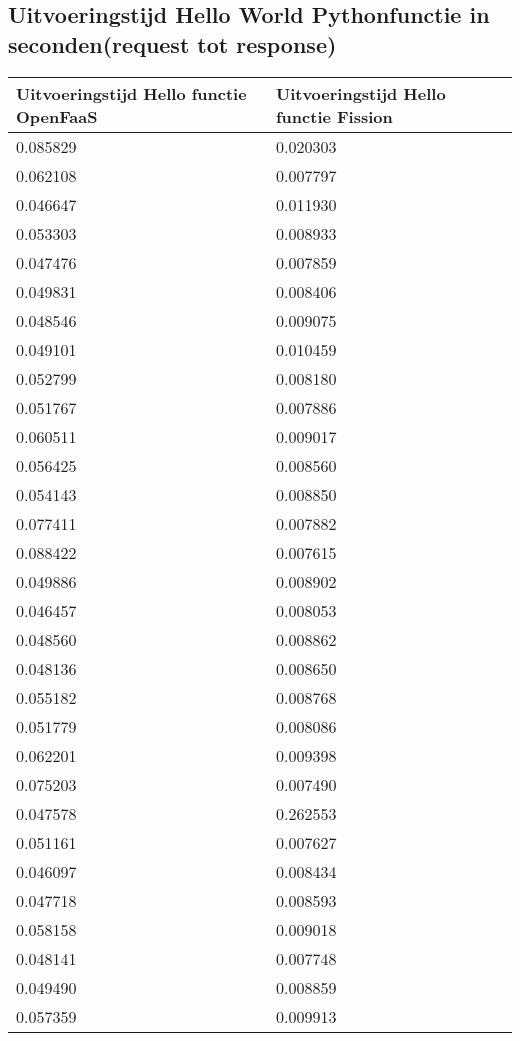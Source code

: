 \subsection{Uitvoeringstijd  Hello World Pythonfunctie in seconden(request tot response)}
\label{sec:uitvoeringstijd-hello-world}
\begin{longtable}[c]{ll}
    \textbf{Uitvoeringstijd Hello functie OpenFaaS} & \textbf{Uitvoeringstijd Hello functie Fission} \\
    \endfirsthead
    \endhead
    0.085829 & 0.020303 \\
    0.062108 & 0.007797 \\
    0.046647 & 0.011930 \\
    0.053303 & 0.008933 \\
    0.047476 & 0.007859 \\
    0.049831 & 0.008406 \\
    0.048546 & 0.009075 \\
    0.049101 & 0.010459 \\
    0.052799 & 0.008180 \\
    0.051767 & 0.007886 \\
    0.060511 & 0.009017 \\
    0.056425 & 0.008560 \\
    0.054143 & 0.008850 \\
    0.077411 & 0.007882 \\
    0.088422 & 0.007615 \\
    0.049886 & 0.008902 \\
    0.046457 & 0.008053 \\
    0.048560 & 0.008862 \\
    0.048136 & 0.008650 \\
    0.055182 & 0.008768 \\
    0.051779 & 0.008086 \\
    0.062201 & 0.009398 \\
    0.075203 & 0.007490 \\
    0.047578 & 0.262553 \\
    0.051161 & 0.007627 \\
    0.046097 & 0.008434 \\
    0.047718 & 0.008593 \\
    0.058158 & 0.009018 \\
    0.048141 & 0.007748 \\
    0.049490 & 0.008859 \\
    0.057359 & 0.009913 \\

\end{longtable}
